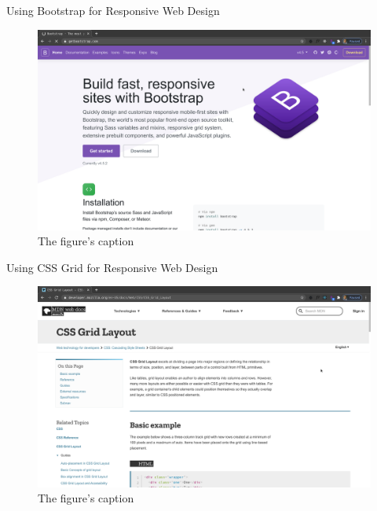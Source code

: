 \documentclass[14pt,aspectratio=169]{beamer}
\begin{document}
%
\begin{frame}{Using Bootstrap for Responsive Web Design}
  \begin{figure}
    \centering
    \includegraphics[scale=.085]{images/bootstrap-site.png}
    \caption{The figure's caption}
  \end{figure}
\end{frame}

%
\begin{frame}{Using CSS Grid for Responsive Web Design}
  \begin{figure}
    \centering
    \includegraphics[scale=.085]{images/cssgrid-site.png}
    \caption{The figure's caption}
  \end{figure}
\end{frame}
\end{document}
